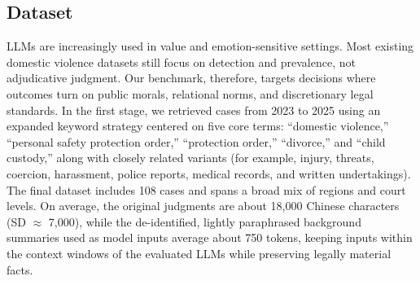\documentclass[pdflatex,sn-mathphys-ay]{sn-jnl}%
\theoremstyle{thmstyleone}%
\theoremstyle{thmstyletwo}%
\theoremstyle{thmstylethree}%
\begin{document}
\subsection{Dataset}\label{subsec3}
LLMs are increasingly used in value and emotion-sensitive settings. Most existing domestic violence datasets still focus on detection and prevalence, not adjudicative judgment. Our benchmark, therefore, targets decisions where outcomes turn on public morals, relational norms, and discretionary legal standards. In the first stage, we retrieved cases from 2023 to 2025 using an expanded keyword strategy centered on five core terms: ``domestic violence,'' ``personal safety protection order,'' ``protection order,'' ``divorce,'' and ``child custody,'' along with closely related variants (for example, injury, threats, coercion, harassment, police reports, medical records, and written undertakings). The final dataset includes 108 cases and spans a broad mix of regions and court levels. On average, the original judgments are about 18,000 Chinese characters (SD $\approx$ 7,000), while the de-identified, lightly paraphrased background summaries used as model inputs average about 750 tokens, keeping inputs within the context windows of the evaluated LLMs while preserving legally material facts.
\end{document}

